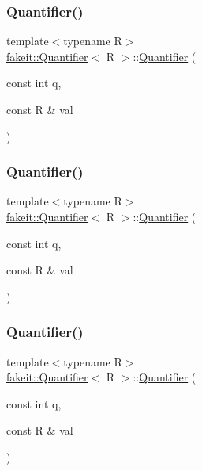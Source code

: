 \subsubsection{\texorpdfstring{Quantifier()}{Quantifier()}\hspace{0.1cm}{\footnotesize\ttfamily [6/9]}}
{\footnotesize\ttfamily template$<$typename R$>$ \\
\mbox{\hyperlink{structfakeit_1_1Quantifier}{fakeit\+::\+Quantifier}}$<$ R $>$\+::\mbox{\hyperlink{structfakeit_1_1Quantifier}{Quantifier}} (\begin{DoxyParamCaption}\item[{const int}]{q,  }\item[{const R \&}]{val }\end{DoxyParamCaption})\hspace{0.3cm}{\ttfamily [inline]}}

\mbox{\label{structfakeit_1_1Quantifier_a9eb6f158c8d585a00e03d1fdcde24af3}} 
\subsubsection{\texorpdfstring{Quantifier()}{Quantifier()}\hspace{0.1cm}{\footnotesize\ttfamily [7/9]}}
{\footnotesize\ttfamily template$<$typename R$>$ \\
\mbox{\hyperlink{structfakeit_1_1Quantifier}{fakeit\+::\+Quantifier}}$<$ R $>$\+::\mbox{\hyperlink{structfakeit_1_1Quantifier}{Quantifier}} (\begin{DoxyParamCaption}\item[{const int}]{q,  }\item[{const R \&}]{val }\end{DoxyParamCaption})\hspace{0.3cm}{\ttfamily [inline]}}

\mbox{\label{structfakeit_1_1Quantifier_a9eb6f158c8d585a00e03d1fdcde24af3}} 
\subsubsection{\texorpdfstring{Quantifier()}{Quantifier()}\hspace{0.1cm}{\footnotesize\ttfamily [8/9]}}
{\footnotesize\ttfamily template$<$typename R$>$ \\
\mbox{\hyperlink{structfakeit_1_1Quantifier}{fakeit\+::\+Quantifier}}$<$ R $>$\+::\mbox{\hyperlink{structfakeit_1_1Quantifier}{Quantifier}} (\begin{DoxyParamCaption}\item[{const int}]{q,  }\item[{const R \&}]{val }\end{DoxyParamCaption})\hspace{0.3cm}{\ttfamily [inline]}}

